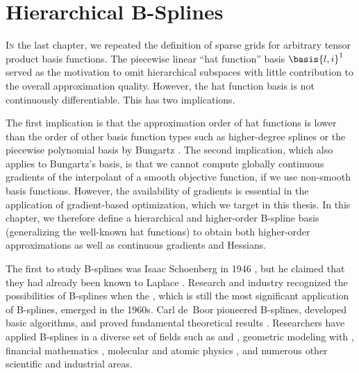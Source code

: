 
\chapter{Hierarchical B-Splines}
\label{chap:30BSplines}



\lettrine{I}{n} the last chapter,
we repeated the definition of sparse grids for
arbitrary tensor product basis functions.
The piecewise linear ``hat function'' basis $\basis{l,i}^1$
served as the motivation to omit hierarchical subspaces with
little contribution to the overall approximation quality.
However, the hat function basis is not continuously differentiable.
This has two implications.


The first implication is that the approximation order of hat functions
is lower than the order of other basis function types
such as higher-degree splines \cite{Sickel11Spline}
or the piecewise polynomial basis by Bungartz \cite{Bungartz98Finite}.
The second implication, which also applies to Bungartz's basis,
is that we cannot compute globally continuous gradients of the
interpolant of a smooth objective function,
if we use non-smooth basis functions.
However, the availability of gradients is
essential in the application of gradient-based optimization,
which we target in this thesis.
In this chapter, we therefore define a hierarchical and
higher-order B-spline basis
(generalizing the well-known hat functions)
to obtain both higher-order approximations
as well as continuous gradients and Hessians.

The first to study B-splines was Isaac Schoenberg in 1946
\cite{Schoenberg46Contributions},
but he claimed that they had already been known to Laplace
\cite{Boor76Splines}.
Research and industry recognized the possibilities of B-splines when
the \fem, which is still the most significant application of B-splines,
emerged in the 1960s.
Carl de~Boor pioneered B-splines, developed basic algorithms, and
proved fundamental theoretical results \cite{Boor72Calculating}.
Researchers have applied B-splines in a diverse set of fields such as
\fem \cite{Hoellig03Finite} and \iga \cite{Hoellig12Finite},
geometric modeling with \nurbs
{},
financial mathematics \cite{Pflueger10Spatially},
molecular and atomic physics
,
and numerous other scientific and industrial areas.

